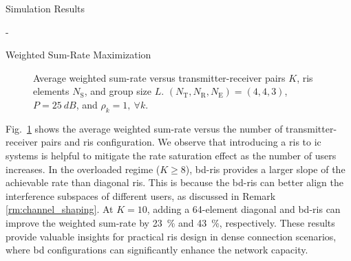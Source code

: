 \begin{section}{Simulation Results}
\begin{subsection}{-}
\begin{subsubsection}{Weighted Sum-Rate Maximization}
			\begin{figure}[H]
				\centering
				\resizebox{0.65\columnwidth}{!}{
					
				}
				\caption{Average weighted sum-rate versus transmitter-receiver pairs $K$, \gls{ris} elements $N_\mathrm{S}$, and group size $L$. $(N_\mathrm{T}, N_\mathrm{R}, N_\mathrm{E}) = (4, 4, 3)$, $P = \qty{25}{dB}$, and $\rho_k = 1, \ \forall k$.}
				\label{sm:ic_rate_user}
			\end{figure}

			Fig.~\ref{sm:ic_rate_user} shows the average weighted sum-rate versus the number of transmitter-receiver pairs and \gls{ris} configuration.
			We observe that introducing a \gls{ris} to \gls{ic} systems is helpful to mitigate the rate saturation effect as the number of users increases.
			In the overloaded regime ($K \ge 8$), \gls{bd}-\gls{ris} provides a larger slope of the achievable rate than diagonal \gls{ris}.
			This is because the \gls{bd}-\gls{ris} can better align the interference subspaces of different users, as discussed in Remark \ref{rm:channel_shaping}.
			At $K=10$, adding a 64-element diagonal and \gls{bd}-\gls{ris} can improve the weighted sum-rate by \qty{23}{\percent} and \qty{43}{\percent}, respectively.
			These results provide valuable insights for practical \gls{ris} design in dense connection scenarios, where \gls{bd} configurations can significantly enhance the network capacity.
		\end{subsubsection}
	\end{subsection}
\end{section}

